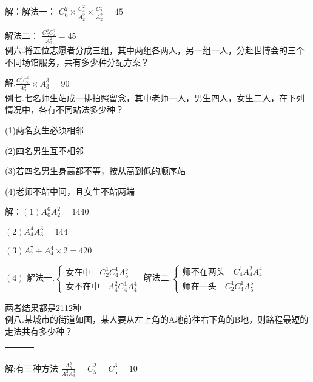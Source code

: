 \documentclass[UTF8]{ctexart}
\begin{document}
解：解法一：
$C_{6}^{2} \times \frac{C_{4}^{2} }{A_{2}^{2} } \times \frac{C_{2}^{1} }{A_{2}^{2} }=45$

解法二：
$\frac{C_{6}^{2} C_{4}^{2} }{A_{2}^{2} } =45$
\\

例六.将五位志愿者分成三组，其中两组各两人，另一组一人，分赴世博会的三个不同场馆服务，共有多少种分配方案？

解.$\frac{C_{5}^{2} C_{3}^{2} }{A_{2}^{2} } \times A_{3}^{3}=90 $
\\

例七.七名师生站成一排拍照留念，其中老师一人，男生四人，女生二人，在下列情况中，各有不同站法多少种？

(1)两名女生必须相邻  

(2)四名男生互不相邻  

(3)若四名男生身高都不等，按从高到低的顺序站  

(4)老师不站中间，且女生不站两端

解：$(1)A_{6}^{6} A_{2}^{2}=1440 $

$(2)A_{4}^{4} A_{3}^{3} =144$

$(3)A_{7}^{7} {\div} A_{4}^{4} \times 2=420$

$(4)$ 解法一.$\left\{\begin{matrix} \text{女在中}\quad C_{2}^{1} C_{4}^{1}A_{5}^{5}  
 \\ \text{女不在中}\quad A_{4}^{2} C_{4}^{1}A_{4}^{4}  
\end{matrix}\right.$ \quad 解法二.$\left\{\begin{matrix} \text{师不在两头}\quad C_{4}^{1} A_{4}^{2}
A_{4}^{4}
 \\ \text{师在一头}\quad C_{2}^{1} C_{4}^{1} A_{5}^{5}  
\end{matrix}\right.$

两者结果都是2112种
\\

例八.某城市的街道如图，某人要从左上角的A地前往右下角的B地，则路程最短的走法共有多少种？

\begin{table}[H]
\begin{tabular}{|l|l|l|}
\hline
 &  &  \\ \hline
 &  &  \\ \hline
\end{tabular}
\end{table}

解:有三种方法  $\frac{A_{5}^{5} }{A_{2}^{2} A_{3}^{3} } =C_{5}^{2} =C_{5}^{3}=10$
\\
\end{document}
